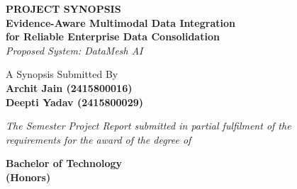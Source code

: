 \documentclass[12pt,a4paper]{article}
\begin{document}
\thispagestyle{empty}


\begin{center}

  \vspace*{0.5cm}

  {\fontsize{20}{24}\selectfont\bfseries PROJECT SYNOPSIS}\\[10pt]

  {\fontsize{21}{25}\selectfont\bfseries
  Evidence-Aware Multimodal Data Integration\\[2pt]
  for Reliable Enterprise Data Consolidation}\\[8pt]

  {\normalsize\itshape Proposed System: DataMesh AI}

  \vspace{1.2cm}

  {\fontsize{14}{17}\selectfont A Synopsis Submitted By}\\[10pt]

  {\fontsize{14}{17}\selectfont\bfseries
  Archit Jain (2415800016)}\\[3pt]

  {\fontsize{14}{17}\selectfont\bfseries
  Deepti Yadav (2415800029)}

  \vspace{1.0cm}

  {\fontsize{12}{15}\selectfont\itshape
  The Semester Project Report submitted in partial fulfilment of the}\\[3pt]

  {\fontsize{12}{15}\selectfont\itshape
  requirements for the award of the degree of}

  \vspace{0.45cm}

  {\fontsize{18}{21}\selectfont\bfseries
  Bachelor of Technology}\\[2pt]

  {\fontsize{18}{21}\selectfont\bfseries
  (Honors)}


\end{center}
\end{document}
